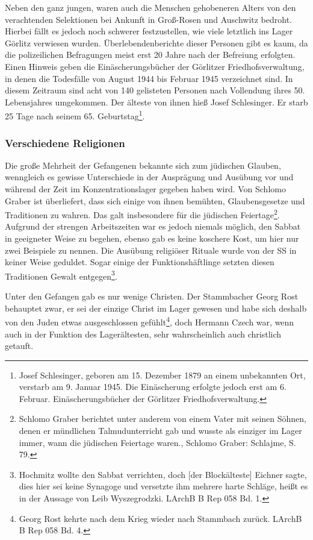 Neben den ganz jungen, waren auch die Menschen gehobeneren Alters von den verachtenden Selektionen bei Ankunft in Groß-Rosen und Auschwitz bedroht. Hierbei fällt es jedoch noch schwerer festzustellen, wie viele letztlich ins Lager Görlitz verwiesen wurden. Überlebendenberichte dieser Personen gibt es kaum, da die polizeilichen Befragungen meist erst 20 Jahre nach der Befreiung erfolgten. Einen Hinweis geben die Einäscherungsbücher der Görlitzer Friedhofsverwaltung, in denen die Todesfälle von August 1944 bis Februar 1945 verzeichnet sind. In diesem Zeitraum sind acht von 140 gelisteten Personen nach Vollendung ihres 50. Lebensjahres umgekommen. Der älteste von ihnen hieß Josef Schlesinger. Er starb 25 Tage nach seinem 65. Geburtstag\footnote{Josef Schlesinger, geboren am 15. Dezember 1879 an einem unbekannten Ort, verstarb am 9. Januar 1945. Die Einäscherung erfolgte jedoch erst am 6. Februar. Einäscherungsbücher der Görlitzer Friedhofsverwaltung.}.\label{alter}

\subsubsection{Verschiedene Religionen}
Die große Mehrheit der Gefangenen bekannte sich zum jüdischen Glauben, wenngleich es gewisse Unterschiede in der Ausprägung und Ausübung vor und während der Zeit im Konzentrationslager gegeben haben wird. Von Schlomo Graber ist überliefert, dass sich einige von ihnen bemühten, Glaubensgesetze und Traditionen zu wahren. Das galt insbesondere für die jüdischen Feiertage\footnote{Schlomo Graber berichtet unter anderem von einem Vater mit seinen Söhnen, denen er mündlichen Talmudunterricht gab und \glqq wusste als einziger im Lager immer, wann die jüdischen Feiertage waren.\grqq, Schlomo Graber: Schlajme, S. 79.}. Aufgrund der strengen Arbeitszeiten war es jedoch niemals möglich, den Sabbat in geeigneter Weise zu begehen, ebenso gab es keine koschere Kost, um hier nur zwei Beispiele zu nennen.
Die Ausübung religiöser Rituale wurde von der SS in keiner Weise geduldet. Sogar einige der Funktionshäftlinge setzten diesen Traditionen Gewalt entgegen\footnote{ Hochmitz wollte den Sabbat verrichten, doch [der Blockälteste] Eichner sagte, dies hier sei keine Synagoge und versetzte ihm mehrere harte Schläge\grqq, heißt es in der Aussage von Leib Wyszegrodzki. LArchB B Rep 058 Bd. 1.}.

Unter den Gefangen gab es nur wenige Christen. Der Stammbacher Georg Rost behauptet zwar, er sei der einzige Christ im Lager gewesen und habe sich deshalb von den Juden etwas ausgeschlossen gefühlt\footnote{Georg Rost kehrte nach dem Krieg wieder nach Stammbach zurück. LArchB B Rep 058 Bd. 4.}, doch Hermann Czech war, wenn auch in der Funktion des Lagerältesten, sehr wahrscheinlich auch christlich getauft.

